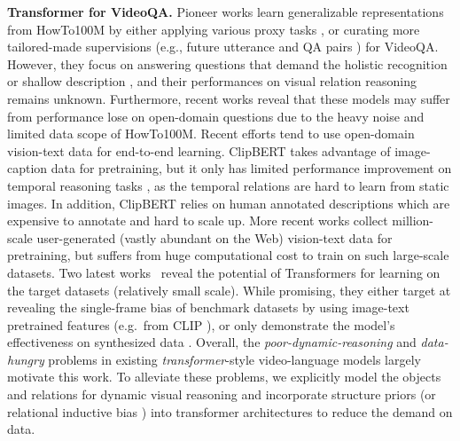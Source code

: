 \documentclass[runningheads]{llncs}
\newcommand{\eg}{e.g.}
\newcommand{\trans}{\emph{transformer}}
\begin{document}
\textbf{Transformer for VideoQA.}
Pioneer works \cite{li2020hero,seo2021look,xu2021videoclip,yang2021just,zhu2020actbert} learn generalizable representations from HowTo100M \cite{miech2019howto100m} by either applying various proxy tasks \cite{zhu2020actbert}, or curating more tailored-made supervisions (\eg, future utterance \cite{seo2021look} and QA pairs \cite{yang2021just}) for VideoQA. However, they focus on answering questions that demand the holistic recognition \cite{xu2017video} or shallow description \cite{yu2018joint}, and their performances on visual relation reasoning \cite{jang2017tgif,xiao2021next} remains unknown. Furthermore, recent works \cite{bain2021frozen,zellers2021merlot} reveal that these models may suffer from performance lose on open-domain questions due to the heavy noise \cite{amrani2021noise,miech2020end} and limited data scope 
of HowTo100M.
Recent efforts tend to use open-domain vision-text data for end-to-end learning. ClipBERT \cite{lei2021less} takes advantage of image-caption data \cite{chen2015microsoft,krishna2017visual} for pretraining, but it only has limited performance improvement on temporal reasoning tasks \cite{jang2017tgif}, as the temporal relations are hard to learn from static images. In addition, ClipBERT relies on human annotated descriptions which are expensive to annotate and hard to scale up. More recent works \cite{fu2021violet,zellers2021merlot} collect million-scale user-generated (vastly abundant on the Web) vision-text data \cite{bain2021frozen,sharma2018conceptual,zellers2021merlot} for pretraining, but suffers from huge computational cost to train on such large-scale datasets. Two latest works~\cite{buch2022revisiting,ding2021attention} reveal the potential of Transformers for learning on the target datasets (relatively small scale). While promising, they either target at revealing the single-frame bias of benchmark datasets by using image-text pretrained features (\eg~from CLIP \cite{radford2021learning}), or only demonstrate the model's effectiveness on synthesized data \cite{yi2019clevrer}.
Overall, the \emph{poor-dynamic-reasoning} and \emph{data-hungry} problems in existing \trans-style video-language models largely motivate this work. To alleviate these problems, we explicitly model the objects and relations for dynamic visual reasoning and incorporate structure priors (or relational inductive bias \cite{battaglia2018relational}) into transformer architectures to reduce the demand on data.
\end{document}
